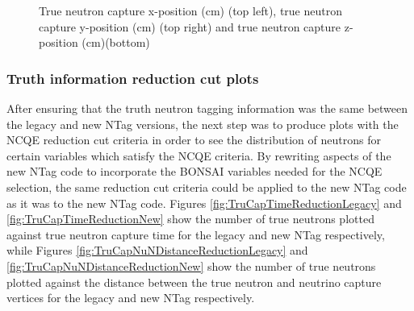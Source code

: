\begin{figure}
\begin{minipage}{0.5\linewidth}
    \end{minipage}\par\medskip
    \centering
    
    \caption{True neutron capture x-position (cm) (top left), true neutron capture y-position (cm) (top right) and true neutron capture z-position (cm)(bottom) }
    \label{fig:TrueNCapPos}
\end{figure}


    
\subsubsection{Truth information reduction cut plots}

After ensuring that the truth neutron tagging information was the same between the legacy and new NTag versions, the next step was to produce plots with the NCQE reduction cut criteria in order to see the distribution of neutrons for certain variables which satisfy the NCQE criteria. By rewriting aspects of the new NTag code to incorporate the BONSAI variables needed for the NCQE selection, the same reduction cut criteria could be applied to the new NTag code as it was to the new NTag code. Figures \ref{fig:TruCapTimeReductionLegacy} and \ref{fig:TruCapTimeReductionNew} show the number of true neutrons plotted against true neutron capture time for the legacy and new NTag respectively, while Figures \ref{fig:TruCapNuNDistanceReductionLegacy} and \ref{fig:TruCapNuNDistanceReductionNew} show the number of true neutrons plotted against the distance between the true neutron and neutrino capture vertices for the legacy and new NTag respectively.

